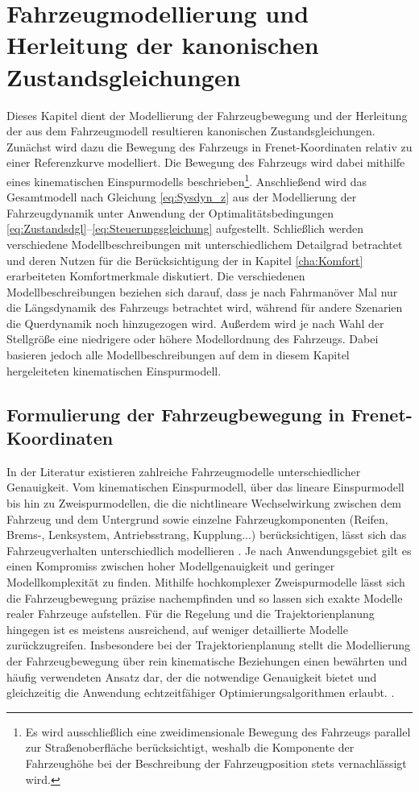 \chapter{Fahrzeugmodellierung und Herleitung der kanonischen Zustandsgleichungen}\label{cha:Modellbildung}
Dieses Kapitel dient der Modellierung der Fahrzeugbewegung und der Herleitung der aus dem Fahrzeugmodell resultieren kanonischen Zustandsgleichungen. Zunächst wird dazu die Bewegung des Fahrzeugs in Frenet-Koordinaten relativ zu einer Referenzkurve modelliert. Die Bewegung des Fahrzeugs wird dabei mithilfe eines kinematischen Einspurmodells beschrieben\footnote{Es wird ausschließlich eine zweidimensionale Bewegung des Fahrzeugs parallel zur Straßenoberfläche berücksichtigt, weshalb die Komponente der Fahrzeughöhe bei der Beschreibung der Fahrzeugposition stets vernachlässigt wird.}. Anschließend wird das Gesamtmodell nach Gleichung \eqref{eq:Sysdyn_z} aus der Modellierung der Fahrzeugdynamik unter Anwendung der Optimalitätsbedingungen \eqref{eq:Zustandsdgl}--\eqref{eq:Steuerungsgleichung} aufgestellt. Schließlich werden verschiedene Modellbeschreibungen mit unterschiedlichem Detailgrad betrachtet und deren Nutzen für die Berücksichtigung der in Kapitel \ref{cha:Komfort} erarbeiteten Komfortmerkmale diskutiert. Die verschiedenen Modellbeschreibungen beziehen sich darauf, dass je nach Fahrmanöver Mal nur die Längsdynamik des Fahrzeugs betrachtet wird, während für andere Szenarien die Querdynamik noch hinzugezogen wird. Außerdem wird je nach Wahl der Stellgröße eine niedrigere oder höhere Modellordnung des Fahrzeugs. Dabei basieren jedoch alle Modellbeschreibungen auf dem in diesem Kapitel hergeleiteten kinematischen Einspurmodell. 
\section{Formulierung der Fahrzeugbewegung in Frenet-Koordinaten}\label{sec:Frenet_KS}
In der Literatur existieren zahlreiche Fahrzeugmodelle unterschiedlicher Genauigkeit. Vom kinematischen Einspurmodell, über das lineare Einspurmodell bis hin zu Zweispurmodellen, die die nichtlineare Wechselwirkung zwischen dem Fahrzeug und dem Untergrund sowie einzelne Fahrzeugkomponenten (Reifen, Brems-, Lenksystem, Antriebsstrang, Kupplung...) berücksichtigen, lässt sich das Fahrzeugverhalten unterschiedlich modellieren \cite{Schramm.2013}. Je nach Anwendungsgebiet gilt es einen Kompromiss zwischen hoher Modellgenauigkeit und geringer Modellkomplexität zu finden. Mithilfe hochkomplexer Zweispurmodelle lässt sich die Fahrzeugbewegung präzise nachempfinden und so lassen sich exakte Modelle realer Fahrzeuge aufstellen. Für die Regelung und die Trajektorienplanung hingegen ist es meistens ausreichend, auf weniger detaillierte Modelle zurückzugreifen. Insbesondere bei der Trajektorienplanung stellt die Modellierung der Fahrzeugbewegung über rein kinematische Beziehungen einen bewährten und häufig verwendeten Ansatz dar, der die notwendige Genauigkeit bietet und gleichzeitig die Anwendung echtzeitfähiger Optimierungsalgorithmen erlaubt. \cite{Rathgeber.2016, Werling.2011, Shi.2021}. 

